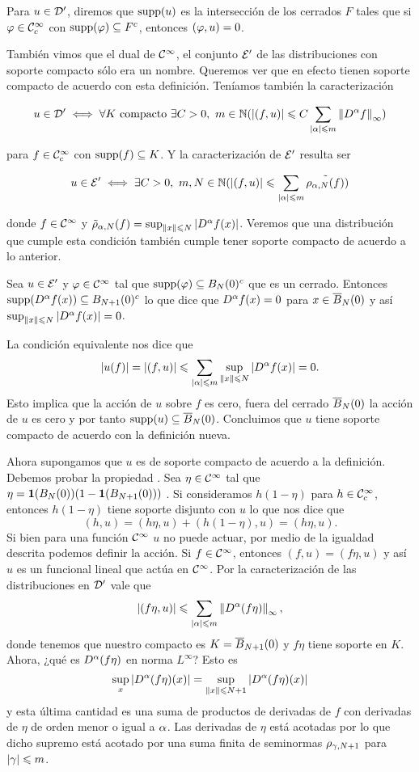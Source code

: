\documentclass[12pt]{memoir}
\begin{document}
\begin{Def}
  Para $u\in\mathcal{D}'$, diremos que $\operatorname{supp}(u)$ es la intersección de los cerrados $F$ tales que si $\varphi\in\mathcal{C}^\infty_c$ con $\operatorname{supp}(\varphi)\subseteq F^c$, entonces $(\varphi,u)=0$. %
\end{Def}

También vimos que el dual de $\mathcal{C}^\infty$, el conjunto $\mathcal{E}'$ de las distribuciones con soporte compacto sólo era un nombre. Queremos ver que en efecto tienen soporte compacto de acuerdo con esta definición. Teníamos también la caracterización

$$u\in\cD'\iff \forall K\ \text{compacto}\ \exists C>0,\ m\in\bN(|(f,u)|\leq C\sum_{|\al|\leq m}\nm{D^\al f}_\infty)$$

para $f\in\mathcal{C}^\infty_c$ con $\operatorname{supp}(f)\subseteq K$. Y la caracterización de $\mathcal{E}'$ resulta ser 

$$u\in\cE'\iff \exists C>0,\ m,N\in\bN(|(f,u)|\leq \sum_{|\al|\leq m}\tilde{\rho_{\al,N}(f)})$$

donde $f\in\mathcal{C}^\infty$ y $\tilde{\rho}_{\alpha,N}(f)=\sup_{\left\|x\right\|\leqslant N}|D^\alpha f(x)|$. Veremos que una distribución que cumple esta condición también cumple tener soporte compacto de acuerdo a lo anterior.

\begin{ptcbp}
  Sea $u\in\mathcal{E}'$ y $\varphi\in\mathcal{C}^\infty$ tal que $\operatorname{supp}(\varphi)\subseteq B_N(0)^c$ que es un cerrado. Entonces  $\operatorname{supp}(D^\alpha f(x))\subseteq B_{N+1}(0)^c$ lo que dice que $D^\alpha f(x)=0$ para $x\in\overline B_N(0)$ y así $\sup_{\left\|x\right\|\leqslant N}|D^\alpha f(x)|=0$.\par 
  La condición equivalente nos dice que 
  $$|u(f)|=|(f,u)|\leqslant\sum_{|\alpha|\leqslant m}\sup_{\left\|x\right\|\leqslant N}|D^\alpha f(x)|=0.$$
  Esto implica que la acción de $u$ sobre $f$ es cero, fuera del cerrado $\overline B_N(0)$ la acción de $u$ es cero y por tanto $\operatorname{supp}(u)\subseteq \overline B_N(0)$. Concluimos que $u$ tiene soporte compacto de acuerdo con la definición nueva.\par 
  Ahora supongamos que $u$ es de soporte compacto de acuerdo a la definición. Debemos probar la propiedad . Sea $\eta\in\mathcal{C}^\infty$ tal que $\eta=\mathbf{1}(B_N(0))(1-\mathbf{1}(B_{N+1}(0)))$ . Si consideramos $h(1-\eta)$ para $h\in\mathcal{C}^\infty_c$, entonces $h(1-\eta)$ tiene soporte disjunto con $u$ lo que nos dice que
  $$(h,u)=(h\eta,u)+(h(1-\eta),u)=(h\eta,u).$$
  Si bien para una función $\mathcal{C}^\infty$ $u$ no puede actuar, por medio de la igualdad descrita podemos definir la acción. Si $f\in\mathcal{C}^\infty$, entonces $(f,u)=(f\eta, u)$ y así $u$ es un funcional lineal que actúa en $\mathcal{C}^\infty$. Por la caracterización de las distribuciones en $\mathcal{D}'$ vale que 
  $$|(f\eta,u)|\leqslant\sum_{|\alpha|\leqslant m}\left\|D^\alpha(f\eta)\right\|_{\infty},$$
  donde tenemos que nuestro compacto es $K=\overline B_{N+1}(0)$ y $f\eta$ tiene soporte en $K$. Ahora, ¿qué es $D^\alpha(f\eta)$ en norma $L^\infty$? Esto es 
  $$\sup_{x}|D^\alpha(f\eta)(x)|=\sup_{\left\|x\right\|\leqslant N+1}|D^\alpha(f\eta)(x)|$$
  y esta última cantidad es una suma de productos de derivadas de $f$ con derivadas de $\eta$ de orden menor o igual a $\alpha$. Las derivadas de $\eta$ está acotadas por lo que dicho supremo está acotado por una suma finita de seminormas $\rho_{\gamma,N+1}$ para $|\gamma|\leqslant m$. 
\end{ptcbp}
\end{document}
